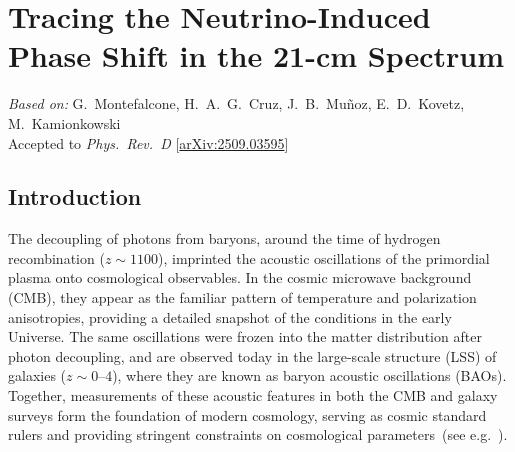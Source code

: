 \chapter{Tracing the Neutrino-Induced Phase Shift in the 21-cm Spectrum}
\label{ch:neutrino-21cm}

\begin{center}
\textit{Based on:} G.~Montefalcone, H.~A.~G.~Cruz, J.~B.~Mu\~noz, E.~D.~Kovetz, M.~Kamionkowski\\
Accepted to \textit{Phys.\ Rev.\ D}
[\href{https://arxiv.org/abs/2509.03595}{arXiv:2509.03595}]
\end{center}
\vspace{1em}


\renewcommand{\GM}[1]{}


\section{Introduction}

\noindent The decoupling of photons from baryons, around the time of hydrogen recombination ($z\sim 1100$), imprinted the acoustic oscillations of the primordial plasma onto cosmological observables. In the cosmic microwave background (CMB), they appear as the familiar pattern of temperature and polarization anisotropies, providing a detailed snapshot of the conditions in the early Universe. The same oscillations were frozen into the matter distribution after photon decoupling, and are observed today in the large-scale  structure (LSS) of galaxies ($z\sim0$--$4$), where they are known as baryon acoustic oscillations (BAOs). Together, measurements of these acoustic features in both
the CMB and galaxy surveys form the foundation of modern cosmology, serving as cosmic standard rulers and providing stringent constraints on cosmological parameters~(see e.g.~\cite{Annis:2022xgg, Chang:2022lrw}).

